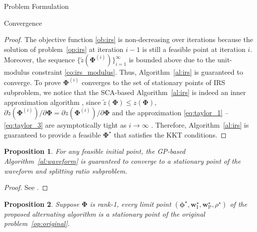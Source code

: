 \documentclass[journal]{IEEEtran}
\newtheorem{proposition}{Proposition}
\begin{document}
\begin{section}{Problem Formulation}
\begin{subsection}{Convergence}
			\begin{proof}\label{pf:irs}
				The objective function \eqref{ob:irs} is non-decreasing over iterations because the solution of problem~\eqref{op:irs} at iteration $i-1$ is still a feasible point at iteration $i$. Moreover, the sequence $\{\tilde{z}(\boldsymbol{\Phi}^{(i)})\}_{i=1}^{\infty}$ is bounded above due to the unit-modulus constraint \eqref{co:irs_modulus}. Thus, Algorithm~\ref{al:irs} is guaranteed to converge. To prove $\boldsymbol{\Phi}^{(i)}$ converges to the set of stationary points of IRS subproblem, we notice that the SCA-based Algorithm~\ref{al:irs} is indeed an inner approximation algorithm \cite{Marks1978}, since $\tilde{z}(\boldsymbol{\Phi}) \le z(\boldsymbol{\Phi})$, $\partial\tilde{z}(\boldsymbol{\Phi}^{(i)})/\partial\boldsymbol{\Phi}=\partial z(\boldsymbol{\Phi}^{(i)})/\partial\boldsymbol{\Phi}$ and the approximation \eqref{eq:taylor_1} -- \eqref{eq:taylor_3} are asymptotically tight as $i \to \infty$ \cite{Li2013}. Therefore, Algorithm~\ref{al:irs} is guaranteed to provide a feasible $\boldsymbol{\Phi}^{\star}$ that satisfies the KKT conditions.
			\end{proof}

			\begin{proposition}\label{pr:waveform}
				For any feasible initial point, the GP-based Algorithm~\ref{al:waveform} is guaranteed to converge to a stationary point of the waveform and splitting ratio subproblem.
			\end{proposition}

			\begin{proof}\label{pf:waveform}
				See \cite{Clerckx2016a,Clerckx2018b}.
			\end{proof}

			\begin{proposition}\label{pr:ao}
				Suppose $\boldsymbol{\Phi}$ is rank-\num{1}, every limit point $(\boldsymbol{\phi}^{\star},\boldsymbol{w}_{\text{I}}^{\star},\boldsymbol{w}_\text{P}^{\star},\rho^{\star})$ of the proposed alternating algorithm is a stationary point of the original problem~\eqref{op:original}.
			\end{proposition}


\end{subsection}
\end{section}
\end{document}
